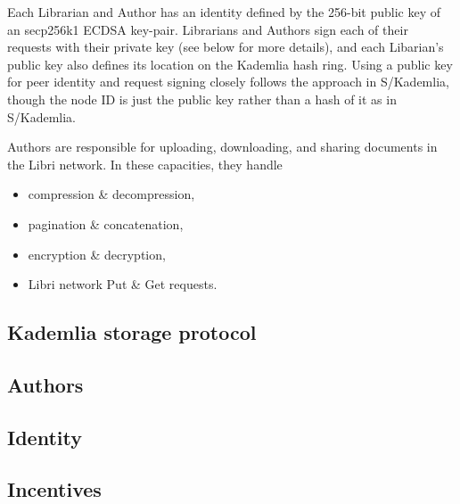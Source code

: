 \documentclass[10pt]{article}
\begin{document}
Each Librarian and Author has an identity defined by the 256-bit public key of an secp256k1 ECDSA key-pair. Librarians and Authors sign each of their requests with their private key (see \label{sec:Identity} below for more details), and each Libarian's public key also defines its location on the Kademlia hash ring. Using a public key for peer identity and request signing closely follows the approach in S/Kademlia, though the node ID is just the public key rather than a hash of it as in S/Kademlia. 

Authors are responsible for uploading, downloading, and sharing documents in the Libri network. In these capacities, they handle
\begin{itemize}
	\item compression & decompression,
	\item pagination & concatenation,
	\item encryption & decryption,
	\item Libri network Put & Get requests.
\end{itemize}







\subsection{Kademlia storage protocol}

\subsection{Authors}
\label{sec:Authors}

\subsection{Identity}
\label{sec:Identity}

\subsection{Incentives}
\end{document}
